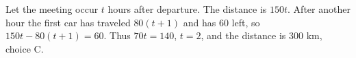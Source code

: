 Let the meeting occur $t$ hours after departure. The distance is $150t$. After another hour the first car has traveled $80(t+1)$ and has $60$ left, so $150t-80(t+1)=60$. Thus $70t=140$, $t=2$, and the distance is $\boxed{300\text{ km}}$, choice C.
